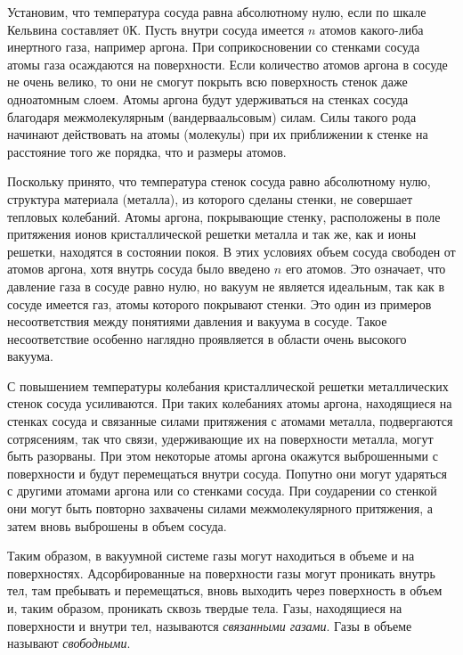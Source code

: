 \documentclass[12pt]{article}
\begin{document}
Установим, что температура сосуда равна абсолютному нулю, если по шкале Кельвина составляет 0К. Пусть внутри сосуда имеется $n$ атомов какого-либа инертного газа, например аргона. При соприкосновении со стенками сосуда атомы газа осаждаются на поверхности. Если количество атомов аргона в сосуде не очень велико, то они не смогут покрыть всю поверхность стенок даже одноатомным слоем. Атомы аргона будут удерживаться на стенках сосуда благодаря межмолекулярным (вандерваальсовым) силам. Силы такого рода начинают действовать на атомы (молекулы) при их приближении к стенке на расстояние того же порядка, что и размеры атомов. \par
Поскольку принято, что температура стенок сосуда равно абсолютному нулю, структура материала (металла), из которого сделаны стенки, не совершает тепловых колебаний. Атомы аргона, покрывающие стенку, расположены в поле притяжения ионов кристаллической решетки металла и так же, как и ионы решетки, находятся в состоянии покоя. В этих условиях объем сосуда свободен от атомов аргона, хотя внутрь сосуда было введено $n$ его атомов. Это означает, что давление газа в сосуде равно нулю, но вакуум не является идеальным, так как в сосуде имеется газ, атомы которого покрывают стенки. Это один из примеров несоответствия между понятиями давления и вакуума в сосуде. Такое несоответствие особенно наглядно проявляется в области очень высокого вакуума. \par
С повышением температуры колебания кристаллической решетки металлических стенок сосуда усиливаются. При таких колебаниях атомы аргона, находящиеся на стенках сосуда и связанные силами притяжения с атомами металла, подвергаются сотрясениям, так что связи, удерживающие их на поверхности металла, могут быть разорваны. При этом некоторые атомы аргона окажутся выброшенными с поверхности и будут перемещаться внутри сосуда. Попутно они могут ударяться с другими атомами аргона или со стенками сосуда. При соударении со стенкой они могут быть повторно захвачены силами межмолекулярного притяжения, а затем вновь выброшены в объем сосуда. \par
Таким образом, в вакуумной системе газы могут находиться в объеме и на поверхностях. Адсорбированные на поверхности газы могут проникать внутрь тел, там пребывать и перемещаться, вновь выходить через поверхность в объем и, таким образом, проникать сквозь твердые тела. Газы, находящиеся на поверхности и внутри тел, называются \textit{связанными газами}. Газы в объеме называют \textit{свободными}.
\end{document}
